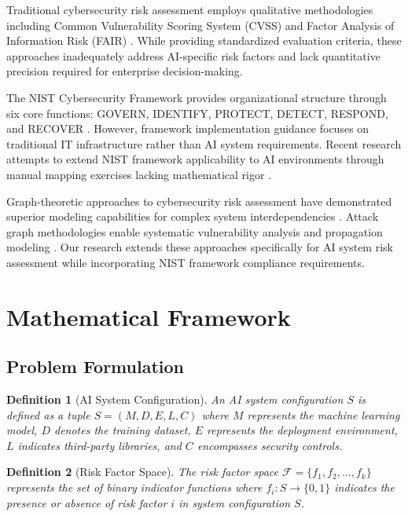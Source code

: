 \documentclass[11pt,letterpaper]{article}
\newtheorem{definition}{Definition}
\begin{document}
Traditional cybersecurity risk assessment employs qualitative methodologies including Common Vulnerability Scoring System (CVSS) and Factor Analysis of Information Risk (FAIR) \cite{Mell2007, Jones2005}. While providing standardized evaluation criteria, these approaches inadequately address AI-specific risk factors and lack quantitative precision required for enterprise decision-making.

The NIST Cybersecurity Framework provides organizational structure through six core functions: GOVERN, IDENTIFY, PROTECT, DETECT, RESPOND, and RECOVER \cite{NISTCSF2024}. However, framework implementation guidance focuses on traditional IT infrastructure rather than AI system requirements. Recent research attempts to extend NIST framework applicability to AI environments through manual mapping exercises lacking mathematical rigor \cite{Yamin2022}.

Graph-theoretic approaches to cybersecurity risk assessment have demonstrated superior modeling capabilities for complex system interdependencies \cite{Wang2017}. Attack graph methodologies enable systematic vulnerability analysis and propagation modeling \cite{Sheyner2002}. Our research extends these approaches specifically for AI system risk assessment while incorporating NIST framework compliance requirements.

\section{Mathematical Framework}

\subsection{Problem Formulation}

\begin{definition}[AI System Configuration]
An AI system configuration $S$ is defined as a tuple $S = (M, D, E, L, C)$ where $M$ represents the machine learning model, $D$ denotes the training dataset, $E$ represents the deployment environment, $L$ indicates third-party libraries, and $C$ encompasses security controls.
\end{definition}

\begin{definition}[Risk Factor Space]
The risk factor space $\mathscr{F} = \{f_1, f_2, \ldots, f_k\}$ represents the set of binary indicator functions where $f_i: S \rightarrow \{0, 1\}$ indicates the presence or absence of risk factor $i$ in system configuration $S$.
\end{definition}
\end{document}
